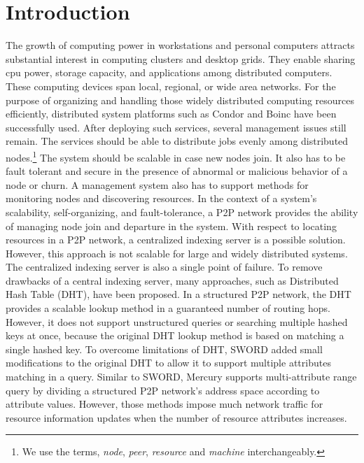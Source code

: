 \documentclass{acm_proc_article-sp}
\begin{document}
\section{Introduction}
The growth of computing power in workstations and personal computers attracts substantial interest in computing clusters and desktop grids\cite{bonic}\cite{condor}. 
They enable sharing cpu power, storage capacity, and applications among distributed computers. 
These computing devices span local, regional, or wide area networks.
For the purpose of organizing and handling those widely distributed computing resources efficiently, distributed system platforms such as Condor\cite{condor} and Boinc\cite{bonic} have been successfully used.
After deploying such services, several management issues still remain. The services should be able to distribute jobs evenly among distributed nodes.\footnote{We use the terms, \textit{node}, \textit{peer}, \textit{resource} and \textit{machine} interchangeably.}
The system should be scalable in case new nodes join. It also has to be fault tolerant and secure in the presence of abnormal or malicious behavior of a node or churn. 
A management system also has to support methods for monitoring nodes and discovering resources.
In the context of a system's scalability, self-organizing, and fault-tolerance, a P2P network\cite{chord}\cite{pastry}\cite{can}\cite{bamboo} provides the ability of managing node join and departure in the system. 
With respect to locating resources in a P2P network, a centralized indexing server is a possible solution\cite{bonic}\cite{condor}.
However, this approach is not scalable for large and widely distributed systems. The centralized indexing server is also a single point of failure.
To remove drawbacks of a central indexing server, many approaches, such as  Distributed Hash Table (DHT), have been proposed.
In a structured P2P network, the DHT provides a scalable lookup method in a guaranteed number of routing hops\cite{chord}\cite{pastry}. 
However, it does not support unstructured queries or searching multiple hashed keys at once, because the original DHT lookup method is based on matching a single hashed key.
To overcome limitations of DHT, SWORD\cite{sword} added small modifications to the original DHT to allow it to support multiple attributes matching in a query.
Similar to SWORD, Mercury\cite{mercury} supports multi-attribute range query by dividing a structured P2P network's address space according to attribute values. 
However, those methods impose much network traffic for resource information updates when the number of resource attributes increases. 
\end{document}
